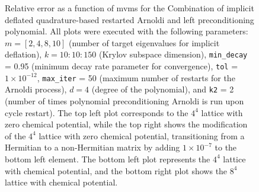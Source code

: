 \begin{figure}[H]
    \caption{\small Relative error as a function of mvms for the Combination of implicit deflated quadrature-based restarted Arnoldi and left preconditioning polynomial. All plots were executed with the following parameters: $m = [2, 4, 8, 10]$ (number of target eigenvalues for implicit deflation), $k = 10:10:150$ (Krylov subspace dimension), \texttt{min\_decay} = 0.95 (minimum decay rate parameter for convergence), \texttt{tol} = $1 \times 10^{-12}$, \texttt{max\_iter} = 50 (maximum number of restarts for the Arnoldi process), $d = 4$ (degree of the polynomial), and \texttt{k2} = 2 (number of times polynomial preconditioning Arnoldi is run upon cycle restart). The top left plot corresponds to the $4^4$ lattice with zero chemical potential, while the top right shows the modification of the $4^4$ lattice with zero chemical potential, transitioning from a Hermitian to a non-Hermitian matrix by adding $1 \times 10^{-7}$ to the bottom left element. The bottom left plot represents the $4^4$ lattice with chemical potential, and the bottom right plot shows the $8^4$ lattice with chemical potential.}
    \label{fig:combo_imp_rest_arnoldi+left_precond_mvms_plot}
\end{figure}

